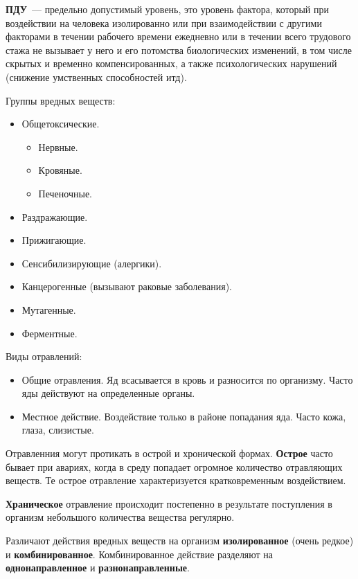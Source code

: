 \textbf{ПДУ}~--- предельно допустимый уровень, это уровень фактора, который при воздействии на человека изолированно или при взаимодействии с другими факторами в течении рабочего времени ежедневно или в течении всего трудового стажа не вызывает у него и его потомства биологических изменений, в том числе скрытых и временно компенсированных, а также психологических нарушений (снижение умственных способностей итд).

Группы вредных веществ:
\begin{itemize}
	\item Общетоксические.
		\begin{itemize}
			\item Нервные.
			\item Кровяные.
			\item Печеночные.
		\end{itemize}
	\item Раздражающие.
	\item Прижигающие.
	\item Сенсибилизирующие (алергики).
	\item Канцерогенные (вызывают раковые заболевания).
	\item Мутагенные.
	\item Ферментные.
\end{itemize}

Виды отравлений:
\begin{itemize}
	\item Общие отравления. Яд всасывается в кровь и разносится по организму. Часто яды действуют на определенные органы.
	\item Местное действие. Воздействие только в районе попадания яда. Часто кожа, глаза, слизистые.
\end{itemize}

Отравленния могут протикать в острой и хронической формах. \textbf{Острое} часто бывает при авариях, когда в среду попадает огромное количество отравляющих веществ. Те острое отравление характеризуется кратковременным воздействием.

\textbf{Храническое} отравление происходит постепенно в результате поступления в организм небольшого количества вещества регулярно.

Различают действия вредных веществ на организм \textbf{изолированное} (очень редкое) и \textbf{комбинированное}. Комбинированное действие разделяют на \textbf{однонаправленное} и \textbf{разнонаправленные}.

